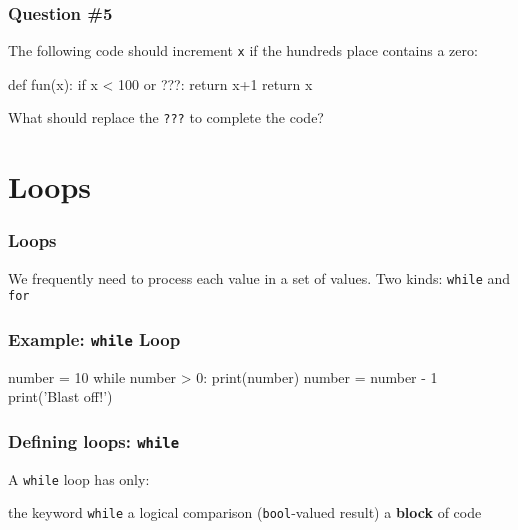 \documentclass[11pt]{beamer}
\begin{document}
\begin{frame}[fragile]
  \frametitle{Question \#5}
  \Enlarge

  The following code should increment \texttt{x} if the hundreds place contains a zero:
  \begin{semiverbatim}
def fun(x):
    if x < 100 or ???:
        return x+1
    return x
  \end{semiverbatim}
  What should replace the \texttt{???} to complete the code?
\end{frame}

\section{Loops}

\begin{frame}[fragile]
  \frametitle{Loops}
  \Enlarge

  \begin{itemize}
  \myitem  We frequently need to process each value in a set of values.
  \myitem  Two kinds:  \texttt{while} and \texttt{for}
  \end{itemize}
\end{frame}

\begin{frame}[fragile]
  \frametitle{Example:  \texttt{while} Loop}
  \Enlarge

  \begin{semiverbatim}
number = 10
while number > 0:
    print(number)
    number = number - 1
print('Blast off!')
  \end{semiverbatim}
\end{frame}

\begin{frame}[fragile]
  \frametitle{Defining loops:  \texttt{while}}
  \Enlarge

  \begin{itemize}
  \myitem  A \texttt{while} loop has only:
    \begin{itemize}
    \mysubitem  the keyword \texttt{while}
    \mysubitem  a logical comparison (\texttt{bool}-valued result)
    \mysubitem  a \textbf{block} of code
    \end{itemize}
  \end{itemize}
\end{frame}
\end{document}
